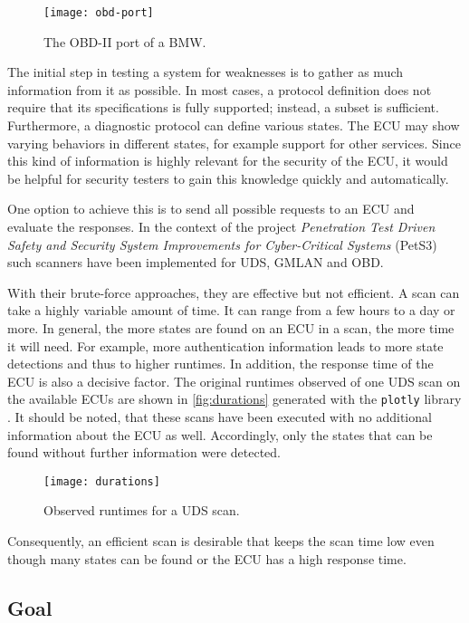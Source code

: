 \begin{figure}[h]
    \centering
    \texttt{[image: obd-port]}
    \caption{The OBD-II port of a BMW.}
    \label{fig:obd-port}
\end{figure}

The initial step in testing a system for weaknesses is to gather as much information from it as possible. In most cases, a protocol definition does not require that its specifications is fully supported; instead, a subset is sufficient.
Furthermore, a diagnostic protocol can define various states. The ECU may show varying behaviors in different states, for example support for other services. Since this kind of information is highly relevant for the security of the ECU, it would be helpful for security testers to gain this knowledge quickly and automatically.

One option to achieve this is to send all possible requests to an ECU and evaluate the responses. In the context of the project \emph{Penetration Test Driven Safety and Security System Improvements for Cyber-Critical Systems} (PetS3) \cite{pets3} such scanners have been implemented for UDS, GMLAN and OBD.

With their brute-force approaches, they are effective but not efficient. A scan can take a highly variable amount of time. It can range from a few hours to a day or more. In general, the more states are found on an ECU in a scan, the more time it will need. For example, more authentication information leads to more state detections and thus to higher runtimes. In addition, the response time of the ECU is also a decisive factor. The original runtimes observed of one UDS scan on the available ECUs are shown in \autoref{fig:durations} generated with the \texttt{plotly} library \cite{plotly}. It should be noted, that these scans have been executed with no additional information about the ECU as well. Accordingly, only the states that can be found without further information were detected.

\begin{figure}[h]
    \centering
    \texttt{[image: durations]}
    \caption{Observed runtimes for a UDS scan.}
    \label{fig:durations}
\end{figure}

Consequently, an efficient scan is desirable that keeps the scan time low even though many states can be found or the ECU has a high response time.

\subsection{Goal}

